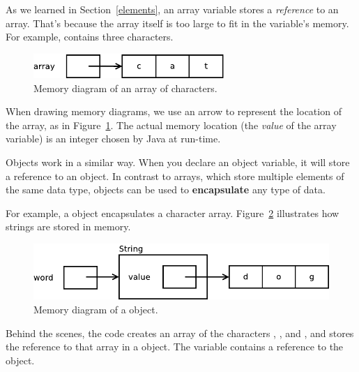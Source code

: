 
As we learned in Section~\ref{elements}, an array variable stores a {\em reference} to an array.
That's because the array itself is too large to fit in the variable's memory.
For example,  contains three characters.

\begin{figure}[!ht]
\begin{center}
\includegraphics[width=205pt]{figs/mem2.pdf}
\caption{Memory diagram of an array of characters.}
\label{fig.mem2}
\end{center}
\end{figure}

When drawing memory diagrams, we use an arrow to represent the location of the array, as in Figure~\ref{fig.mem2}.
The actual memory location (the {\em value} of the array variable) is an integer chosen by Java at run-time.

Objects work in a similar way.
When you declare an object variable, it will store a reference to an object.
In contrast to arrays, which store multiple elements of the same data type, objects can be used to {\bf encapsulate} any type of data.

For example, a  object encapsulates a character array.
Figure~\ref{fig.mem3} illustrates how strings are stored in memory.

\begin{figure}[!ht]
\begin{center}
\includegraphics[width=325pt]{figs/mem3.pdf}
\caption{Memory diagram of a  object.}
\label{fig.mem3}
\end{center}
\end{figure}

Behind the scenes, the code  creates an array of the characters , , and , and stores the reference to that array in a  object.
The variable  contains a reference to the  object.

